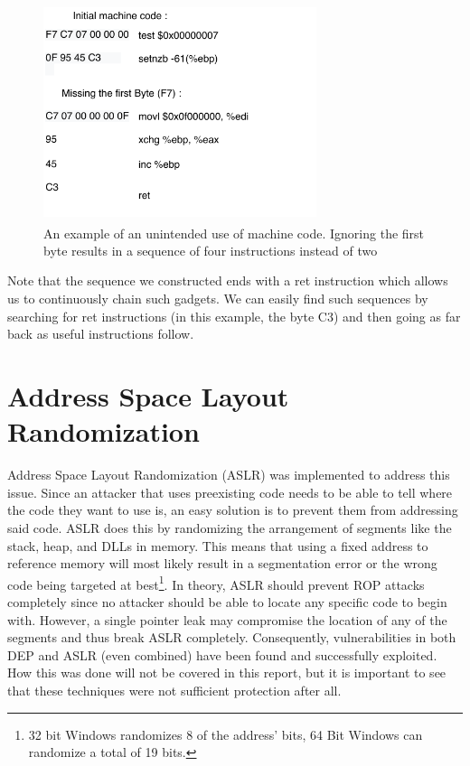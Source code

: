 \documentclass[10pt,twocolumn,a4paper]{article}
\begin{document}
\begin{figure}[h]
  \includegraphics[keepaspectratio,width=8cm]{fig/ByteCode}
  \caption{An example of an unintended use of machine code\textsuperscript{\cite{geometry}}. Ignoring the first byte results in a sequence of four instructions instead of two}
\end{figure}\newline
Note that the sequence we constructed ends with a ret instruction which allows us to continuously chain such gadgets.
We can easily find such sequences by searching for ret instructions (in this example, the byte C3) and then going as far back as useful instructions follow\cite{gadgets}.

\section{Address Space Layout Randomization}\label{sec:ASLR}
Address Space Layout Randomization (ASLR) was implemented to address this issue.
Since an attacker that uses preexisting code needs to be able to tell where the code they want to use is, an easy solution is to prevent them from addressing said code.
ASLR does this by randomizing the arrangement of segments like the stack, heap, and DLLs in memory\cite{ASLR}. This means that using a fixed address to reference memory will most likely result in a segmentation error or the wrong code being targeted at best\footnote{32 bit Windows randomizes 8 of the address' bits, 64 Bit Windows can randomize a total of 19 bits.}. 
In theory, ASLR should prevent ROP attacks completely since no attacker should be able to locate any specific code to begin with.
However, a single pointer leak may compromise the location of any of the segments and thus break ASLR completely.
Consequently, vulnerabilities in both DEP and ASLR (even combined) have been found and successfully exploited\cite{bypass}.
How this was done will not be covered in this report, but it is important to see that these techniques were not sufficient protection after all.
\end{document}
